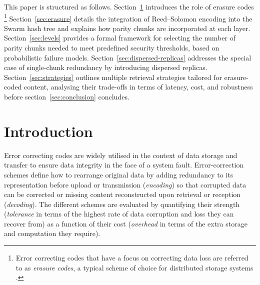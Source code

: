 \documentclass[manuscript,screen,review]{acmart}
\begin{document}

\maketitle


This paper is structured as follows.
Section~\ref{sec:error-correcting-codes} introduces the role of erasure codes%
%
\footnote{Error correcting codes that have a focus on correcting data loss are referred to as \emph{erasure codes}, a typical scheme of choice for distributed storage systems \citep{balaji2018erasure}.}
%
Section~\ref{sec:erasure} details the integration of Reed–Solomon encoding into the Swarm hash tree and explains how parity chunks are incorporated at each layer.
Section~\ref{sec:levels} provides a formal framework for selecting the number of parity chunks needed to meet predefined security thresholds, based on probabilistic failure models.
Section~\ref{sec:dispersed-replicas} addresses the special case of single-chunk redundancy by introducing dispersed replicas.
Section~\ref{sec:strategies} outlines multiple retrieval strategies tailored for erasure-coded content, analysing their trade-offs in terms of latency, cost, and robustness before section~\ref{sec:conclusion} concludes.

\section{Introduction} \label{sec:error-correcting-codes}

Error correcting codes are widely utilised in the context of data storage and transfer to ensure data integrity in the face of a system fault. Error-correction schemes define how to rearrange original data by adding redundancy to its representation before upload or transmission (\emph{encoding}) so that corrupted data can be corrected or missing content reconstructed upon retrieval or reception (\emph{decoding}). The different schemes are evaluated by quantifying their strength (\emph{tolerance} in terms of the highest rate of data corruption and loss they can recover from) as a function of their cost (\emph{overhead} in terms of the extra storage and computation they require).
\end{document}
